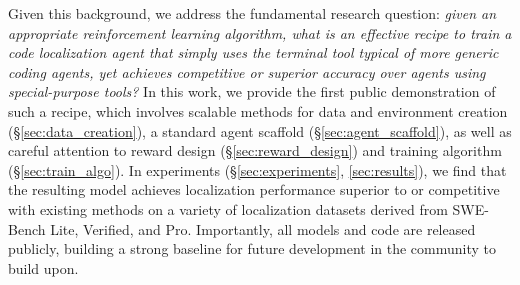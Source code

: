 Given this background, we address the fundamental research question: \emph{given an appropriate reinforcement learning algorithm, what is an effective recipe to train a code localization agent that simply uses the terminal tool typical of more generic coding agents, yet achieves competitive or superior accuracy over agents using special-purpose tools?}
In this work, we provide the first public demonstration of such a recipe, which involves scalable methods for data and environment creation (\S\ref{sec:data_creation}), a standard agent scaffold (\S\ref{sec:agent_scaffold}), as well as careful attention to reward design (\S\ref{sec:reward_design}) and training algorithm (\S\ref{sec:train_algo}).
In experiments (\S\ref{sec:experiments}, \autoref{sec:results}), we find that the resulting model \methodname achieves localization performance superior to or competitive with existing methods on a variety of localization datasets derived from SWE-Bench Lite, Verified, and Pro.
Importantly, all models and code are released publicly, building a strong baseline for future development in the community to build upon.



